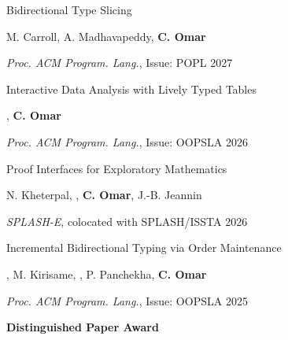 \documentclass[10pt,letterpaper]{article}
\renewenvironment{itemize}{
  \begin{list}{}{
    \setlength{\leftmargin}{1.25em}
    \setlength{\itemsep}{0.25em}
    \setlength{\parskip}{0pt}
    \setlength{\parsep}{0.2em}
  }
}{
  \end{list}
}
\begin{document}
\begin{enumerate}[leftmargin=*, labelindent=6.5em, font=\bfseries]

  \item[POPL 2027]{Bidirectional Type Slicing}
  \begin{itemize}
    \item M. Carroll, A. Madhavapeddy, \textbf{C. Omar}
    \item \textit{Proc. ACM Program. Lang.}, Issue: POPL 2027
  \end{itemize}

  \item[OOPSLA 2026]{Interactive Data Analysis with Lively Typed Tables}
  \begin{itemize}
    \item {}, \textbf{C. Omar}
    \item \textit{Proc. ACM Program. Lang.}, Issue: OOPSLA 2026
  \end{itemize}

  \item[SPLASH-E 2026]{Proof Interfaces for Exploratory Mathematics}
  \begin{itemize}
    \item N. Kheterpal, , \textbf{C. Omar}, J.-B. Jeannin
    \item \textit{SPLASH-E}, colocated with SPLASH/ISSTA 2026
  \end{itemize}

  \item[OOPSLA 2025]{Incremental Bidirectional Typing via Order Maintenance}
  \begin{itemize}
    \item {}, M. Kirisame, , P. Panchekha, \textbf{C. Omar}
    \item \textit{Proc. ACM Program. Lang.}, Issue: OOPSLA 2025
    \item \textbf{Distinguished Paper Award}
  \end{itemize}
    

\end{enumerate}
\end{document}
